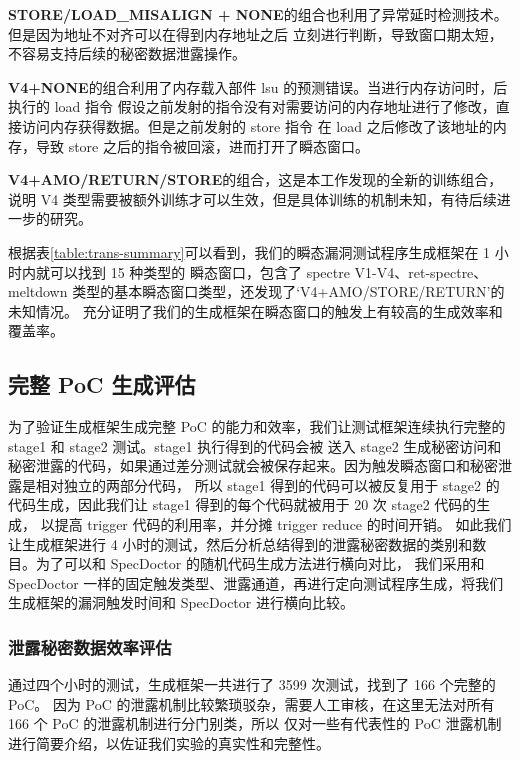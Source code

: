 \textbf{STORE/LOAD\_MISALIGN + NONE}的组合也利用了异常延时检测技术。但是因为地址不对齐可以在得到内存地址之后
立刻进行判断，导致窗口期太短，不容易支持后续的秘密数据泄露操作。\par

\textbf{V4+NONE}的组合利用了内存载入部件 lsu 的预测错误。当进行内存访问时，后执行的 load 指令
假设之前发射的指令没有对需要访问的内存地址进行了修改，直接访问内存获得数据。但是之前发射的 store 指令
在 load 之后修改了该地址的内存，导致 store 之后的指令被回滚，进而打开了瞬态窗口。\par

\textbf{V4+AMO/RETURN/STORE}的组合，这是本工作发现的全新的训练组合，
说明 V4 类型需要被额外训练才可以生效，但是具体训练的机制未知，有待后续进一步的研究。\par

根据表\ref{table:trans-summary}可以看到，我们的瞬态漏洞测试程序生成框架在 1 小时内就可以找到 15 种类型的
瞬态窗口，包含了 spectre V1-V4、ret-spectre、meltdown 类型的基本瞬态窗口类型，还发现了‘V4+AMO/STORE/RETURN’的未知情况。
充分证明了我们的生成框架在瞬态窗口的触发上有较高的生成效率和覆盖率。\par

\subsection{完整 PoC 生成评估}

为了验证生成框架生成完整 PoC 的能力和效率，我们让测试框架连续执行完整的 stage1 和 stage2 测试。stage1 执行得到的代码会被
送入 stage2 生成秘密访问和秘密泄露的代码，如果通过差分测试就会被保存起来。因为触发瞬态窗口和秘密泄露是相对独立的两部分代码，
所以 stage1 得到的代码可以被反复用于 stage2 的代码生成，因此我们让 stage1 得到的每个代码就被用于 20 次 stage2 代码的生成，
以提高 trigger 代码的利用率，并分摊 trigger reduce 的时间开销。
如此我们让生成框架进行 4 小时的测试，然后分析总结得到的泄露秘密数据的类别和数目。为了可以和 SpecDoctor 的随机代码生成方法进行横向对比，
我们采用和 SpecDoctor 一样的固定触发类型、泄露通道，再进行定向测试程序生成，将我们生成框架的漏洞触发时间和 SpecDoctor 进行横向比较。\par

\subsubsection{泄露秘密数据效率评估}

通过四个小时的测试，生成框架一共进行了 3599 次测试，找到了 166 个完整的 PoC。
因为 PoC 的泄露机制比较繁琐驳杂，需要人工审核，在这里无法对所有 166 个 PoC 的泄露机制进行分门别类，所以
仅对一些有代表性的 PoC 泄露机制进行简要介绍，以佐证我们实验的真实性和完整性。\par

